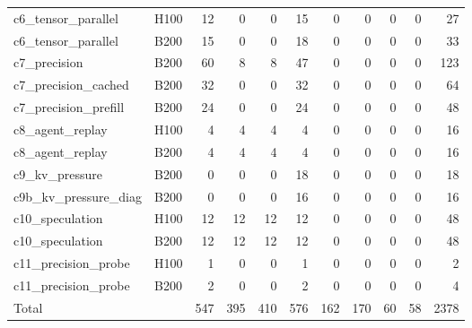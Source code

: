 \begin{landscape}
\begin{longtable}{llrrrrrrrrr}
c6\_tensor\_parallel & H100 & 12 & 0 & 0 & 15 & 0 & 0 & 0 & 0 & 27 \\
c6\_tensor\_parallel & B200 & 15 & 0 & 0 & 18 & 0 & 0 & 0 & 0 & 33 \\
c7\_precision & B200 & 60 & 8 & 8 & 47 & 0 & 0 & 0 & 0 & 123 \\
c7\_precision\_cached & B200 & 32 & 0 & 0 & 32 & 0 & 0 & 0 & 0 & 64 \\
c7\_precision\_prefill & B200 & 24 & 0 & 0 & 24 & 0 & 0 & 0 & 0 & 48 \\
c8\_agent\_replay & H100 & 4 & 4 & 4 & 4 & 0 & 0 & 0 & 0 & 16 \\
c8\_agent\_replay & B200 & 4 & 4 & 4 & 4 & 0 & 0 & 0 & 0 & 16 \\
c9\_kv\_pressure & B200 & 0 & 0 & 0 & 18 & 0 & 0 & 0 & 0 & 18 \\
c9b\_kv\_pressure\_diag & B200 & 0 & 0 & 0 & 16 & 0 & 0 & 0 & 0 & 16 \\
c10\_speculation & H100 & 12 & 12 & 12 & 12 & 0 & 0 & 0 & 0 & 48 \\
c10\_speculation & B200 & 12 & 12 & 12 & 12 & 0 & 0 & 0 & 0 & 48 \\
c11\_precision\_probe & H100 & 1 & 0 & 0 & 1 & 0 & 0 & 0 & 0 & 2 \\
c11\_precision\_probe & B200 & 2 & 0 & 0 & 2 & 0 & 0 & 0 & 0 & 4 \\
Total &  & 547 & 395 & 410 & 576 & 162 & 170 & 60 & 58 & 2378 \\
\end{longtable}
\endgroup
\end{landscape}
\restoregeometry
